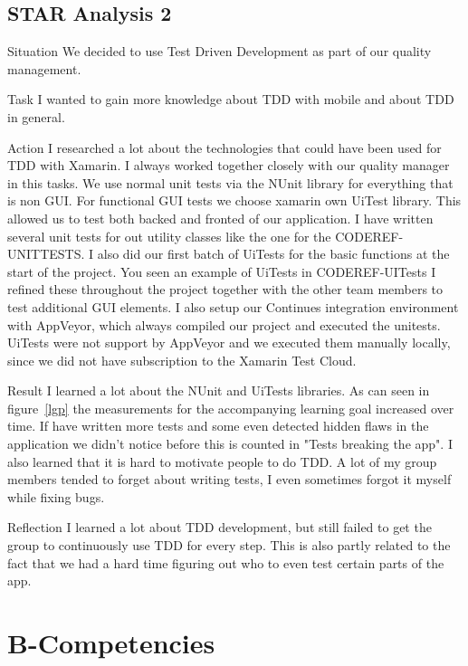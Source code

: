 \documentclass[12pt]{article}
\begin{document}
\subsection{STAR Analysis 2}
\begin{STAR}
    \item[Situation] We decided to use Test Driven Development as part of our quality management. 
    \item[Task] I wanted to gain more knowledge about TDD with mobile and about TDD in general. 
    \item[Action] I researched a lot about the technologies that could have been used for TDD with Xamarin. I always worked together closely with our quality manager in this tasks. We use normal unit tests via the NUnit library for everything that is non GUI. For functional GUI tests we choose xamarin own UiTest library. This allowed us to test both backed and fronted of our application. I have written several unit tests for out utility classes like the one for the CODEREF-UNITTESTS. I also did our first batch of UiTests for the basic functions at the start of the project. You seen an example of UiTests in CODEREF-UITests I refined these throughout the project together with the other team members to test additional GUI elements. I also setup our Continues integration environment with AppVeyor, which always compiled our project and executed the unitests. UiTests were not support by AppVeyor and we executed them manually locally, since we did not have subscription to the Xamarin Test Cloud.
    \item[Result] I learned a lot about the NUnit and UiTests libraries. 
    As can seen in figure~\ref{lgp} the measurements for the accompanying learning goal increased over time. If have written more tests and some even detected hidden flaws in the application we didn't notice before this is counted in "Tests breaking the app". I also learned that it is hard to motivate people to do TDD. A lot of my group members tended to forget about writing tests, I even sometimes forgot it myself while fixing bugs.
    \item[Reflection] I learned a lot about TDD development, but still failed to get the group to continuously use TDD for every step. This is also partly related to the fact that we had a hard time figuring out who to even test certain parts of the app.
\end{STAR}

\section{B-Competencies}
\end{document}
